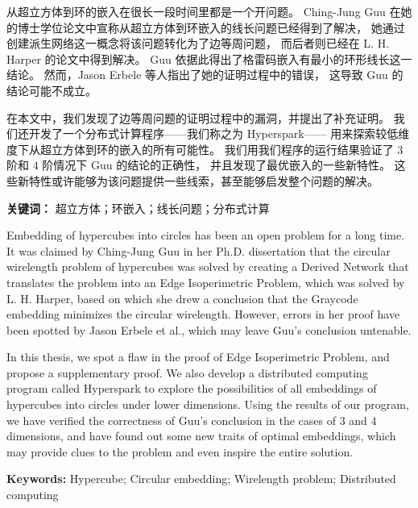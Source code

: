 
\label{Abstract CN}

从超立方体到环的嵌入在很长一段时间里都是一个开问题。
Ching-Jung Guu 在她的博士学位论文中宣称从超立方体到环嵌入的线长问题已经得到了解决，
她通过创建派生网络这一概念将该问题转化为了边等周问题，
而后者则已经在 L. H. Harper 的论文中得到解决。
Guu 依据此得出了格雷码嵌入有最小的环形线长这一结论。
然而，Jason Erbele 等人指出了她的证明过程中的错误，
这导致 Guu 的结论可能不成立。

在本文中，我们发现了边等周问题的证明过程中的漏洞，并提出了补充证明。
我们还开发了一个分布式计算程序——我们称之为 Hyperspark——
用来探索较低维度下从超立方体到环的嵌入的所有可能性。
我们用我们程序的运行结果验证了 $3$ 阶和 $4$ 阶情况下 Guu 的结论的正确性，
并且发现了最优嵌入的一些新特性。
这些新特性或许能够为该问题提供一些线索，甚至能够启发整个问题的解决。
\hfill\break

\textbf{关键词：} 超立方体；环嵌入；线长问题；分布式计算

\label{Abstract EN}

Embedding of hypercubes into circles has been an open problem for a long time.
It was claimed by Ching-Jung Guu in her Ph.D. dissertation that
the circular wirelength problem of hypercubes was solved by creating a Derived
Network that translates the problem into an Edge Isoperimetric Problem,
which was solved by L. H. Harper, based on which
she drew a conclusion that the Graycode embedding minimizes the circular wirelength.
However, errors in her proof have been spotted by Jason Erbele et al.,
which may leave Guu's conclusion untenable.

In this thesis, we spot a flaw in the proof of Edge Isoperimetric Problem,
and propose a supplementary proof.
We also develop a distributed computing program called Hyperspark to
explore the possibilities of all embeddings of hypercubes into circles under lower dimensions.
Using the results of our program,
we have verified the correctness of Guu's conclusion in the cases of $3$ and $4$ dimensions,
and have found out some new traits of optimal embeddings,
which may provide clues to the problem and even inspire the entire solution.
\hfill\break

\textbf{Keywords:} Hypercube; Circular embedding; Wirelength problem;
Distributed computing
